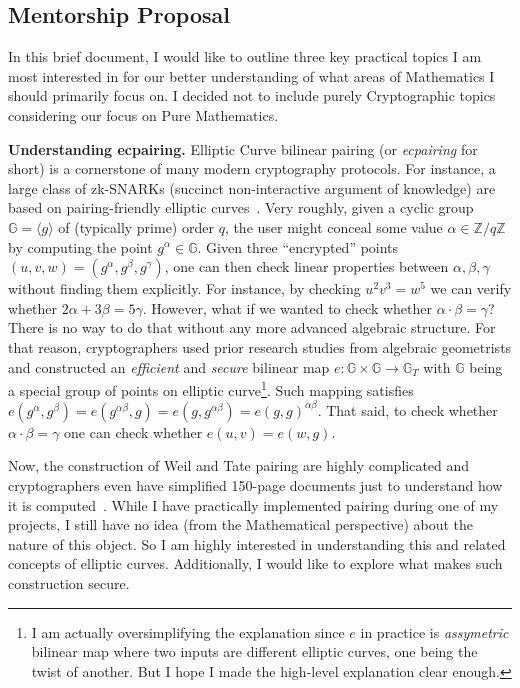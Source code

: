 \documentclass{template}
\begin{document}
\subsection*{Mentorship Proposal}

In this brief document, I would like to outline three key practical topics I am
most interested in for our better understanding of what areas of Mathematics I
should primarily focus on. I decided not to include purely Cryptographic topics
considering our focus on Pure Mathematics.

\textbf{Understanding ecpairing.} Elliptic Curve bilinear pairing (or
\textit{ecpairing} for short) is a cornerstone of many modern cryptography
protocols. For instance, a large class of zk-SNARKs (succinct non-interactive
argument of knowledge) are based on pairing-friendly elliptic
curves~\cite{pari,groth16}. Very roughly, given a cyclic group $\mathbb{G} =
\langle g \rangle$ of (typically prime) order $q$, the user might conceal some
value $\alpha \in \mathbb{Z}/q\mathbb{Z}$ by computing the point $g^{\alpha} \in
\mathbb{G}$. Given three ``encrypted'' points $(u,v,w)=(g^{\alpha}, g^{\beta},
g^{\gamma})$, one can then check linear properties between $\alpha,\beta,\gamma$
without finding them explicitly. For instance, by checking $u^2v^3 = w^5$ we can
verify whether $2\alpha+3\beta=5\gamma$. However, what if we wanted to check
whether $\alpha \cdot \beta = \gamma$? There is no way to do that without any
more advanced algebraic structure. For that reason, cryptographers used prior
research studies from algebraic geometrists and constructed an
\textit{efficient} and \textit{secure} bilinear map $e: \mathbb{G} \times
\mathbb{G} \to \mathbb{G}_T$ with $\mathbb{G}$ being a special group of points
on elliptic curve\footnote{I am actually oversimplifying the explanation since
$e$ in practice is \textit{assymetric} bilinear map where two inputs are
different elliptic curves, one being the twist of another. But I hope I made the
high-level explanation clear enough.}. Such mapping satisfies
$e(g^{\alpha},g^{\beta})=e(g^{\alpha\beta},g)=e(g,g^{\alpha\beta})=e(g,g)^{\alpha\beta}$.
That said, to check whether $\alpha \cdot \beta = \gamma$ one can check whether
$e(u,v) = e(w,g)$. 

Now, the construction of Weil and Tate pairing are highly complicated and
cryptographers even have simplified 150-page documents just to understand
how it is computed~\cite{pairing-for-beginners}. While I have practically
implemented pairing during one of my projects, I still have no idea (from
the Mathematical perspective) about the nature of this object. So I am
highly interested in understanding this and related concepts of elliptic
curves. Additionally, I would like to explore what makes such construction
secure.
\end{document}
